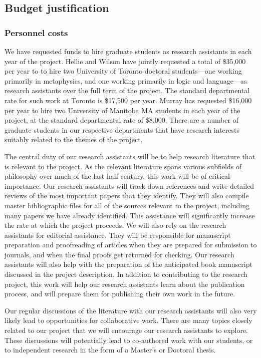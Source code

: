 \documentclass[12pt]{article}
\begin{document}
\subsection*{Budget justification}

\subsubsection*{Personnel costs}

We have requested funds to hire graduate students as research assistants in
each year of the project.  Hellie and Wilson have jointly requested a total
of  \$35,000 per year
to to hire two University of Toronto doctoral students---one working primarily
in metaphysics, and one working primarily in logic and language---as research assistants
over the full term of the project. The standard departmental rate for such
work at Toronto is \$17,500 per year.  Murray has requested \$16,000 per year
to hire two University of Manitoba MA students in each year of the project, at
the standard departmental rate of \$8,000. There are a number of
graduate students in our respective departments that have research interests
suitably related to the themes of the project. 

The central duty of our research assistants will be to help research
literature that is relevant to the project. As the relevant literature spans
various subfields of philosophy over much of the last half century, this work
will be of critical importance. Our research assistants will track down
references and write detailed reviews of the most important papers that they
identify. They will also compile master bibliographic files for all of the
sources relevant to the project, including many papers we have already
identified. This assistance will significantly increase the rate at which the
project proceeds. We will also rely on the research assistants for editorial
assistance. They will be responsible for manuscript preparation and
proofreading of articles when they are prepared for submission to journals,
and when the final proofs get returned for checking. Our research assistants
will also help with the preparation of the anticipated book manuscript
discussed in the project description.  In addition to contributing to the
research project, this work will help our research
assistants learn about the publication process, and will prepare them for
publishing their own work in the future.

Our regular discussions of the literature with our research assistants will
also very likely lead to opportunities for collaborative work. There are many
topics closely related to our project that we will encourage our research
assistants to explore. These discussions will potentially lead to
co-authored work with our students, or to independent research in the form of
a Master's or Doctoral thesis. 
\end{document}
